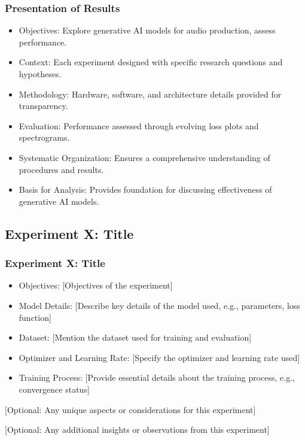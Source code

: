 \begin{frame}
    \frametitle{Presentation of Results}

    \begin{itemize}
        \item Objectives: Explore generative AI models for audio production, assess performance.
        \item Context: Each experiment designed with specific research questions and hypotheses.
        \item Methodology: Hardware, software, and architecture details provided for transparency.
        \item Evaluation: Performance assessed through evolving loss plots and spectrograms.
        \item Systematic Organization: Ensures a comprehensive understanding of procedures and results.
        \item Basis for Analysis: Provides foundation for discussing effectiveness of generative AI models.
    \end{itemize}
\end{frame}

\subsection{Experiment X: Title} \label{sec:expX}

\begin{frame}
    \frametitle{Experiment X: Title}

    \begin{itemize}
        \item Objectives: [Objectives of the experiment]
        \item Model Details: [Describe key details of the model used, e.g., parameters, loss function]
        \item Dataset: [Mention the dataset used for training and evaluation]
        \item Optimizer and Learning Rate: [Specify the optimizer and learning rate used]
        \item Training Process: [Provide essential details about the training process, e.g., convergence status]
    \end{itemize}

    [Optional: Any unique aspects or considerations for this experiment]

    [Optional: Any additional insights or observations from this experiment]

\end{frame}

